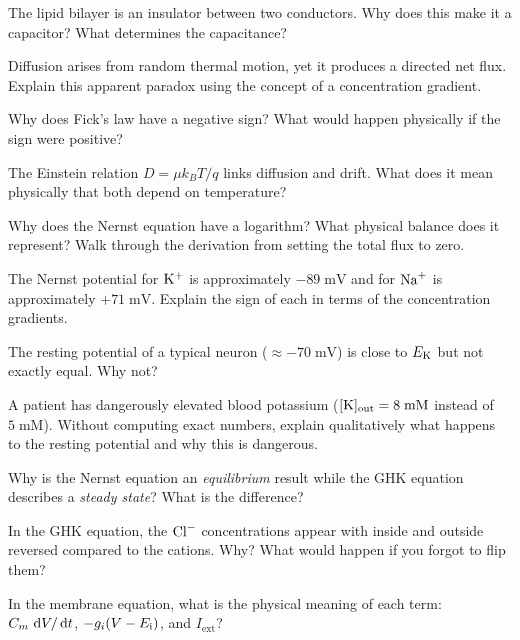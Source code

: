 \begin{conceptquestions}
  \item The lipid bilayer is an insulator between two conductors. Why does this make it a capacitor? What determines the capacitance?

  \item Diffusion arises from random thermal motion, yet it produces a directed net flux. Explain this apparent paradox using the concept of a concentration gradient.

  \item Why does Fick's law have a negative sign? What would happen physically if the sign were positive?

  \item The Einstein relation $D = \mu k_B T / q$ links diffusion and drift. What does it mean physically that both depend on temperature?

  \item Why does the Nernst equation have a logarithm? What physical balance does it represent? Walk through the derivation from setting the total flux to zero.

  \item The Nernst potential for $\mathrm{K}^+$ is approximately $-89\;\text{mV}$ and for $\mathrm{Na}^+$ is approximately $+71\;\text{mV}$. Explain the sign of each in terms of the concentration gradients.

  \item The resting potential of a typical neuron ($\approx -70\;\text{mV}$) is close to $E_{\mathrm{K}}$ but not exactly equal. Why not?

  \item A patient has dangerously elevated blood potassium ($[\mathrm{K}]_{\text{out}} = 8\;\text{mM}$ instead of $5\;\text{mM}$). Without computing exact numbers, explain qualitatively what happens to the resting potential and why this is dangerous.

  \item Why is the Nernst equation an \emph{equilibrium} result while the GHK equation describes a \emph{steady state}? What is the difference?

  \item In the GHK equation, the $\mathrm{Cl}^-$ concentrations appear with inside and outside reversed compared to the cations. Why? What would happen if you forgot to flip them?

  \item In the membrane equation, what is the physical meaning of each term: $C_m\,\mathop{}\!\mathrm{d} V/\mathop{}\!\mathrm{d} t$, $-g_i(V - E_{\mathrm{i}})$, and $I_{\text{ext}}$?


\end{conceptquestions}
